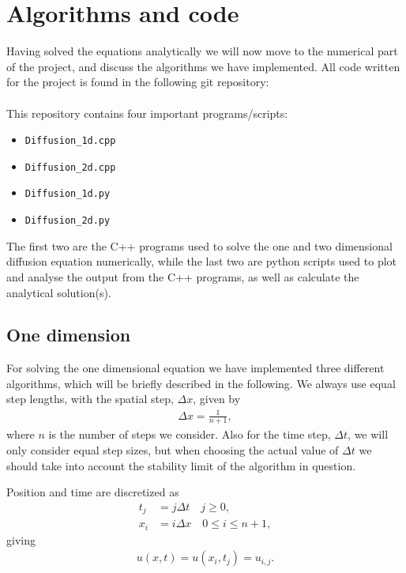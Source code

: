 \documentclass[12pt, a4paper]{article}
\begin{document}
\section{Algorithms and code}  

Having solved the equations analytically we will now move to the numerical part of the project, and 
discuss the algorithms we have implemented. All code written for the project is found in 
the following git repository: \vspace{0.5cm} \\ 
 \vspace{0.5cm} \\ 
This repository contains four important programs/scripts: 
\begin{itemize}
\item \texttt{Diffusion\_1d.cpp}
\item \texttt{Diffusion\_2d.cpp}
\item \texttt{Diffusion\_1d.py}
\item \texttt{Diffusion\_2d.py}
\end{itemize}
The first two are the C++ programs used to solve the one and two dimensional diffusion equation
numerically, while the last two are python scripts used to plot and analyse the output from the 
C++ programs, as well as calculate the analytical solution(s). 

\subsection{One dimension}

For solving the one dimensional equation we have implemented three different algorithms, which will
be briefly described in the following. We always use equal step lengths, with the spatial step, $\Delta x$, 
given by 
\begin{align*}
\Delta x = \frac{1}{n+1},  
\end{align*}  
where $n$ is the number of steps we consider. Also for the time step, $\Delta t$, we will only consider 
equal step sizes, but when choosing the actual value of $\Delta t$ we should take into account the 
stability limit of the algorithm in question. 

Position and time are discretized as 
\begin{align*}
t_j & = j\Delta t \quad j\geq 0,  \\
x_i & = i \Delta x \quad 0 \leq i \leq n+1,  
\end{align*} 
giving 
\begin{align*}
u(x,t) = u(x_i, t_j) = u_{i,j}. 
\end{align*}
\end{document}

